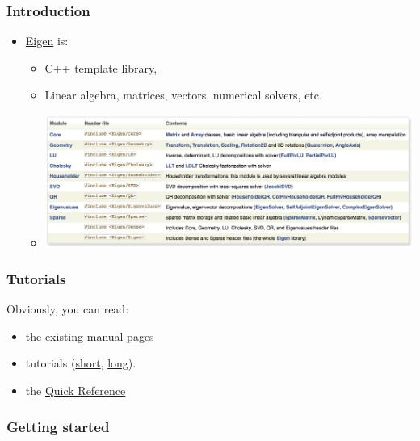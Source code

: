 \subsubsection{Introduction}\label{introduction-3}

\begin{itemize}
\itemsep1pt\parskip0pt
\item
  \href{http://eigen.tuxfamily.org}{Eigen} is:

  \begin{itemize}
  \itemsep1pt\parskip0pt
  \item
    C++ template library,
  \item
    Linear algebra, matrices, vectors, numerical solvers, etc.
  \item
    \includegraphics{88cpplibraries/figures/eigenContents.png}
  \end{itemize}
\end{itemize}

\subsubsection{Tutorials}\label{tutorials-1}

Obviously, you can read:

\begin{itemize}
\itemsep1pt\parskip0pt
\item
  the existing \href{http://eigen.tuxfamily.org/dox/index.html}{manual
  pages}
\item
  tutorials
  (\href{http://eigen.tuxfamily.org/dox/GettingStarted.html}{short},
  \href{http://eigen.tuxfamily.org/dox/group__TutorialMatrixClass.html}{long}).
\item
  the
  \href{http://eigen.tuxfamily.org/dox/group__QuickRefPage.html}{Quick
  Reference}
\end{itemize}

\subsubsection{Getting started}\label{getting-started}

